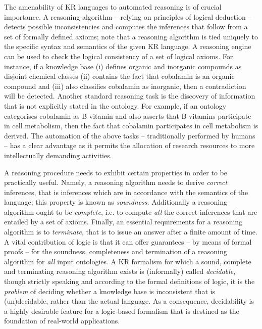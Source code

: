 \documentclass[10pt]{bmc_article}
\newenvironment{bmcformat}{\baselineskip20pt\sloppy\setboolean{publ}{false}}{\baselineskip20pt\sloppy}
\begin{document}
\begin{bmcformat}
The amenability of KR languages to automated reasoning is of crucial importance. A reasoning algorithm -- relying on principles of logical deduction -- detects possible inconsistencies and computes the inferences that follow from a set of formally defined axioms; note that a reasoning algorithm is tied uniquely to the specific syntax and semantics of the given KR language. A reasoning engine can be used to check the logical consistency of a set of logical axioms. For instance, if a knowledge base (i) defines organic and inorganic compounds as disjoint chemical classes (ii) contains the fact that cobalamin is an organic compound and (iii) also classifies cobalamin as inorganic, then a contradiction will be detected. Another standard reasoning task is the discovery of information that is not explicitly stated in the ontology. For example, if an ontology categorises cobalamin as B vitamin and also asserts that B vitamins participate in cell metabolism, then the fact that cobalamin participates in cell metabolism is derived. The automation of the above tasks -- traditionally performed by humans -- has a clear advantage as it permits the allocation of research resources to more intellectually demanding activities.

A reasoning procedure needs to exhibit certain properties in order to be practically useful. Namely, a reasoning algorithm needs to derive \emph{correct} inferences, that is inferences which are in accordance with the semantics of the language; this property is known as \emph{soundness}. Additionally a reasoning algorithm ought to be \emph{complete}, i.e. to compute \emph{all} the correct inferences that are entailed by a set of axioms. Finally, an essential requirements for a reasoning algorithm is to \emph{terminate}, that is to issue an answer after a finite amount of time. A vital contribution of logic is that it can offer guarantees -- by means of formal proofs -- for the soundness, completeness and termination of a reasoning algorithm for \emph{all} input ontologies. A KR formalism for which a sound, complete and terminating reasoning algorithm exists is (informally) called \emph{decidable}, though strictly speaking and according to the formal definitions of logic, it is the \emph{problem} of deciding whether a knowledge base is inconsistent that is (un)decidable, rather than the actual language. As a consequence, decidability is a highly desirable feature for a logic-based formalism that is destined as the foundation of real-world applications.


\end{bmcformat}
\end{document}
